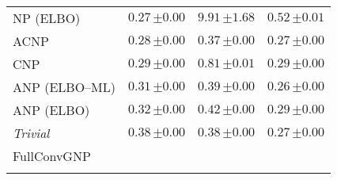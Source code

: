 \begin{tabular}[t]{lccc}
NP (ELBO) & $0.27\,{ \scriptstyle \pm  0.00 }$ & $9.91\,{ \scriptstyle \pm  1.68 }$ & $0.52\,{ \scriptstyle \pm  0.01 }$ \\ 
ACNP & $0.28\,{ \scriptstyle \pm  0.00 }$ & $0.37\,{ \scriptstyle \pm  0.00 }$ & $0.27\,{ \scriptstyle \pm  0.00 }$ \\ 
CNP & $0.29\,{ \scriptstyle \pm  0.00 }$ & $0.81\,{ \scriptstyle \pm  0.01 }$ & $0.29\,{ \scriptstyle \pm  0.00 }$ \\ 
ANP (ELBO--ML) & $0.31\,{ \scriptstyle \pm  0.00 }$ & $0.39\,{ \scriptstyle \pm  0.00 }$ & $0.26\,{ \scriptstyle \pm  0.00 }$ \\ 
ANP (ELBO) & $0.32\,{ \scriptstyle \pm  0.00 }$ & $0.42\,{ \scriptstyle \pm  0.00 }$ & $0.29\,{ \scriptstyle \pm  0.00 }$ \\ 
{\normalshape \textit{Trivial}} & $0.38\,{ \scriptstyle \pm  0.00 }$ & $0.38\,{ \scriptstyle \pm  0.00 }$ & $0.27\,{ \scriptstyle \pm  0.00 }$ \\ 
FullConvGNP &  &  &  \\ 
\bottomrule \\ 
\end{tabular} 
